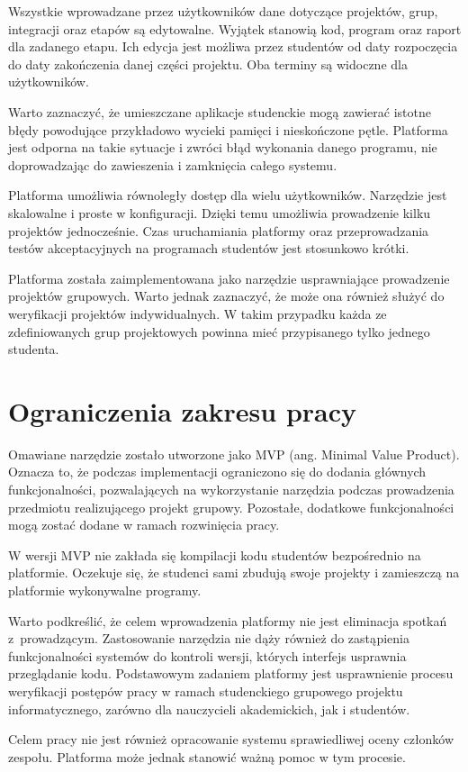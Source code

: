 Wszystkie wprowadzane przez użytkowników dane dotyczące projektów, grup, integracji oraz etapów są edytowalne.
Wyjątek stanowią kod, program oraz raport dla zadanego etapu.
Ich edycja jest możliwa przez studentów od daty rozpoczęcia do daty zakończenia danej części projektu.
Oba terminy są widoczne dla użytkowników.

Warto zaznaczyć, że umieszczane aplikacje studenckie mogą zawierać istotne błędy powodujące przykładowo wycieki pamięci i nieskończone pętle.
Platforma jest odporna na takie sytuacje i zwróci błąd wykonania danego programu, nie doprowadzając do zawieszenia i zamknięcia całego systemu.

Platforma umożliwia równoległy dostęp dla wielu użytkowników.
Narzędzie jest skalowalne i proste w konfiguracji.
Dzięki temu umożliwia prowadzenie kilku projektów jednocześnie.
Czas uruchamiania platformy oraz przeprowadzania testów akceptacyjnych na programach studentów jest stosunkowo krótki.

Platforma została zaimplementowana jako narzędzie usprawniające prowadzenie projektów grupowych.
Warto jednak zaznaczyć, że może ona również służyć do weryfikacji projektów indywidualnych.
W takim przypadku każda ze zdefiniowanych grup projektowych powinna mieć przypisanego tylko jednego studenta.


\section{Ograniczenia zakresu pracy}

Omawiane narzędzie zostało utworzone jako MVP (ang. Minimal Value Product).
Oznacza to, że podczas implementacji ograniczono się do dodania głównych funkcjonalności, pozwalających na wykorzystanie narzędzia podczas prowadzenia przedmiotu realizującego projekt grupowy.
Pozostałe, dodatkowe funkcjonalności mogą zostać dodane w ramach rozwinięcia pracy.

W wersji MVP nie zakłada się kompilacji kodu studentów bezpośrednio na platformie.
Oczekuje się, że studenci sami zbudują swoje projekty i zamieszczą na platformie wykonywalne programy.

Warto podkreślić, że celem wprowadzenia platformy nie jest eliminacja spotkań z~prowadzącym.
Zastosowanie narzędzia nie dąży również do zastąpienia funkcjonalności systemów do kontroli wersji, których interfejs usprawnia przeglądanie kodu.
Podstawowym zadaniem platformy jest usprawnienie procesu weryfikacji postępów pracy w ramach studenckiego grupowego projektu informatycznego, zarówno dla nauczycieli akademickich, jak i studentów.

Celem pracy nie jest również opracowanie systemu sprawiedliwej oceny członków zespołu.
Platforma może jednak stanowić ważną pomoc w tym procesie.




